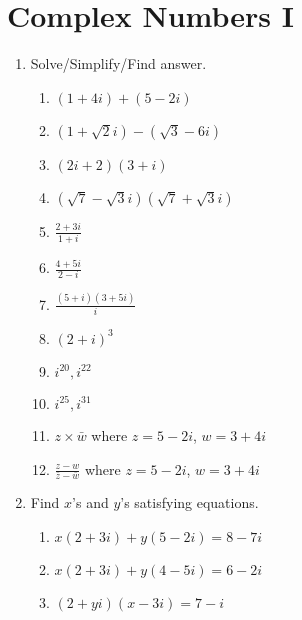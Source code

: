 \documentclass{article}
\begin{document}

\section{Complex Numbers I}
	\begin{enumerate}[1.]
		\item Solve/Simplify/Find answer.
		\begin{enumerate}[({1}.1)]
			\item $(1 + 4i) + (5 -2i)$
			
			\item $(1 + \sqrt{2}i) - (\sqrt{3} - 6i)$
			
			\item $(2i + 2)(3 + i)$
			
			\item $(\sqrt{7} - \sqrt{3}i)(\sqrt{7} + \sqrt{3}i)$
			
			\item $\frac{2 + 3i}{1 + i}$
			
			\item $\frac{4 + 5i}{2 - i}$
			
			\item $\frac{(5 + i)(3 + 5i)}{i}$
			
			\item $(2 + i)^3$
			
			\item $i^{20}, i^{22}$
			
			\item $i^{25}, i^{31}$
			
			\item $z \times \bar{w}$ where $z = 5 - 2i$, $w = 3 + 4i$
			
			\item $\frac{z - w}{\bar{z} - \bar{w}}$ where $z = 5 - 2i$, $w = 3 + 4i$
		\end{enumerate}
		
		\item Find $x$'s and $y$'s satisfying equations.
		\begin{enumerate}[(2.1)]
			\item $x(2 + 3i) + y(5 - 2i) = 8 - 7i$
			
			\item $x(2 + 3i) + y(4 - 5i) = 6 - 2i$
			
			\item $(2 + yi)(x - 3i) = 7 - i$
			

\end{enumerate}
\end{enumerate}
\end{document}
